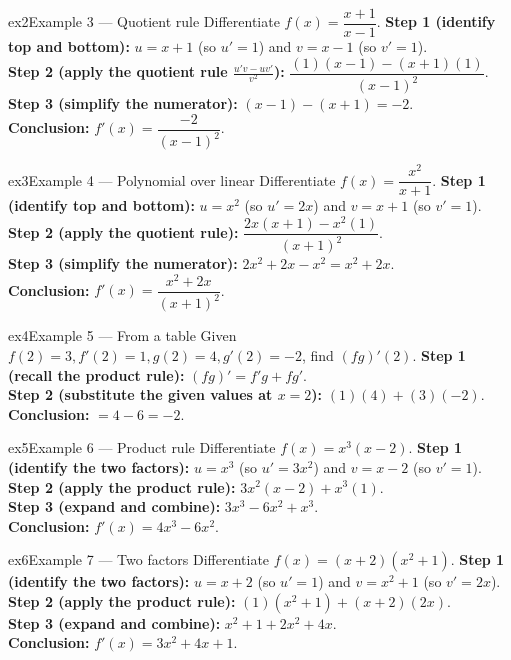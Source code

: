 \documentclass[11pt]{article}
\begin{document}
\begin{example}{ex2}{Example 3 --- Quotient rule}
Differentiate $f(x)=\dfrac{x+1}{x-1}$.\soln
\textbf{Step 1 (identify top and bottom):} $u=x+1$ (so $u'=1$) and $v=x-1$ (so $v'=1$).\\[3pt]
\textbf{Step 2 (apply the quotient rule $\frac{u'v-uv'}{v^2}$):} $\dfrac{(1)(x-1)-(x+1)(1)}{(x-1)^2}$.\\[3pt]
\textbf{Step 3 (simplify the numerator):} $(x-1)-(x+1)=-2$.\\[3pt]
\textbf{Conclusion:} $f'(x)=\dfrac{-2}{(x-1)^2}$.
\end{example}

\begin{example}{ex3}{Example 4 --- Polynomial over linear}
Differentiate $f(x)=\dfrac{x^2}{x+1}$.\soln
\textbf{Step 1 (identify top and bottom):} $u=x^2$ (so $u'=2x$) and $v=x+1$ (so $v'=1$).\\[3pt]
\textbf{Step 2 (apply the quotient rule):} $\dfrac{2x(x+1)-x^2(1)}{(x+1)^2}$.\\[3pt]
\textbf{Step 3 (simplify the numerator):} $2x^2+2x-x^2=x^2+2x$.\\[3pt]
\textbf{Conclusion:} $f'(x)=\dfrac{x^2+2x}{(x+1)^2}$.
\end{example}

\begin{example}{ex4}{Example 5 --- From a table}
Given $f(2)=3,f'(2)=1,g(2)=4,g'(2)=-2$, find $(fg)'(2)$.\soln
\textbf{Step 1 (recall the product rule):} $(fg)'=f'g+fg'$.\\[3pt]
\textbf{Step 2 (substitute the given values at $x=2$):} $(1)(4)+(3)(-2)$.\\[3pt]
\textbf{Conclusion:} $=4-6=-2$.
\end{example}

\begin{example}{ex5}{Example 6 --- Product rule}
Differentiate $f(x)=x^3(x-2)$.\soln
\textbf{Step 1 (identify the two factors):} $u=x^3$ (so $u'=3x^2$) and $v=x-2$ (so $v'=1$).\\[3pt]
\textbf{Step 2 (apply the product rule):} $3x^2(x-2)+x^3(1)$.\\[3pt]
\textbf{Step 3 (expand and combine):} $3x^3-6x^2+x^3$.\\[3pt]
\textbf{Conclusion:} $f'(x)=4x^3-6x^2$.
\end{example}

\begin{example}{ex6}{Example 7 --- Two factors}
Differentiate $f(x)=(x+2)(x^2+1)$.\soln
\textbf{Step 1 (identify the two factors):} $u=x+2$ (so $u'=1$) and $v=x^2+1$ (so $v'=2x$).\\[3pt]
\textbf{Step 2 (apply the product rule):} $(1)(x^2+1)+(x+2)(2x)$.\\[3pt]
\textbf{Step 3 (expand and combine):} $x^2+1+2x^2+4x$.\\[3pt]
\textbf{Conclusion:} $f'(x)=3x^2+4x+1$.
\end{example}
\end{document}
